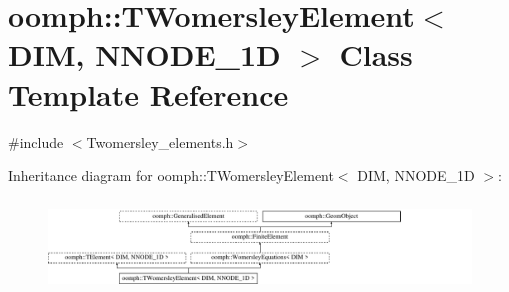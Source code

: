 \hypertarget{classoomph_1_1TWomersleyElement}{}\section{oomph\+:\+:T\+Womersley\+Element$<$ D\+IM, N\+N\+O\+D\+E\+\_\+1D $>$ Class Template Reference}
\label{classoomph_1_1TWomersleyElement}


{\ttfamily \#include $<$Twomersley\+\_\+elements.\+h$>$}

Inheritance diagram for oomph\+:\+:T\+Womersley\+Element$<$ D\+IM, N\+N\+O\+D\+E\+\_\+1D $>$\+:\begin{figure}[H]
\begin{center}
\leavevmode
\includegraphics[height=2.488889cm]{classoomph_1_1TWomersleyElement}
\end{center}
\end{figure}
